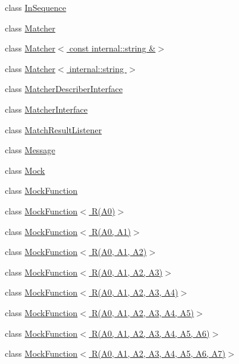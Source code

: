 \begin{DoxyCompactItemize}
\item 
class \hyperlink{classtesting_1_1_in_sequence}{In\+Sequence}
\item 
class \hyperlink{classtesting_1_1_matcher}{Matcher}
\item 
class \hyperlink{classtesting_1_1_matcher_3_01const_01internal_1_1string_01_6_4}{Matcher$<$ const internal\+::string \&$>$}
\item 
class \hyperlink{classtesting_1_1_matcher_3_01internal_1_1string_01_4}{Matcher$<$ internal\+::string $>$}
\item 
class \hyperlink{classtesting_1_1_matcher_describer_interface}{Matcher\+Describer\+Interface}
\item 
class \hyperlink{classtesting_1_1_matcher_interface}{Matcher\+Interface}
\item 
class \hyperlink{classtesting_1_1_match_result_listener}{Match\+Result\+Listener}
\item 
class \hyperlink{classtesting_1_1_message}{Message}
\item 
class \hyperlink{classtesting_1_1_mock}{Mock}
\item 
class \hyperlink{classtesting_1_1_mock_function}{Mock\+Function}
\item 
class \hyperlink{classtesting_1_1_mock_function_3_01_r_07_a0_08_4}{Mock\+Function$<$ R(\+A0)$>$}
\item 
class \hyperlink{classtesting_1_1_mock_function_3_01_r_07_a0_00_01_a1_08_4}{Mock\+Function$<$ R(\+A0, A1)$>$}
\item 
class \hyperlink{classtesting_1_1_mock_function_3_01_r_07_a0_00_01_a1_00_01_a2_08_4}{Mock\+Function$<$ R(\+A0, A1, A2)$>$}
\item 
class \hyperlink{classtesting_1_1_mock_function_3_01_r_07_a0_00_01_a1_00_01_a2_00_01_a3_08_4}{Mock\+Function$<$ R(\+A0, A1, A2, A3)$>$}
\item 
class \hyperlink{classtesting_1_1_mock_function_3_01_r_07_a0_00_01_a1_00_01_a2_00_01_a3_00_01_a4_08_4}{Mock\+Function$<$ R(\+A0, A1, A2, A3, A4)$>$}
\item 
class \hyperlink{classtesting_1_1_mock_function_3_01_r_07_a0_00_01_a1_00_01_a2_00_01_a3_00_01_a4_00_01_a5_08_4}{Mock\+Function$<$ R(\+A0, A1, A2, A3, A4, A5)$>$}
\item 
class \hyperlink{classtesting_1_1_mock_function_3_01_r_07_a0_00_01_a1_00_01_a2_00_01_a3_00_01_a4_00_01_a5_00_01_a6_08_4}{Mock\+Function$<$ R(\+A0, A1, A2, A3, A4, A5, A6)$>$}
\item 
class \hyperlink{classtesting_1_1_mock_function_3_01_r_07_a0_00_01_a1_00_01_a2_00_01_a3_00_01_a4_00_01_a5_00_01_a6_00_01_a7_08_4}{Mock\+Function$<$ R(\+A0, A1, A2, A3, A4, A5, A6, A7)$>$}

\end{DoxyCompactItemize}
